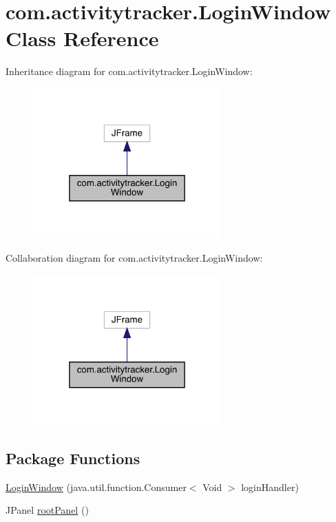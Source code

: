 \hypertarget{classcom_1_1activitytracker_1_1_login_window}{}\section{com.\+activitytracker.\+Login\+Window Class Reference}
\label{classcom_1_1activitytracker_1_1_login_window}


Inheritance diagram for com.\+activitytracker.\+Login\+Window\+:\nopagebreak
\begin{figure}[H]
\begin{center}
\leavevmode
\includegraphics[width=205pt]{classcom_1_1activitytracker_1_1_login_window__inherit__graph}
\end{center}
\end{figure}


Collaboration diagram for com.\+activitytracker.\+Login\+Window\+:\nopagebreak
\begin{figure}[H]
\begin{center}
\leavevmode
\includegraphics[width=205pt]{classcom_1_1activitytracker_1_1_login_window__coll__graph}
\end{center}
\end{figure}
\subsection*{Package Functions}
\begin{DoxyCompactItemize}
\item 
\mbox{\hyperlink{classcom_1_1activitytracker_1_1_login_window_a137cce127ffa1660c70d3fddbc0e2a74}{Login\+Window}} (java.\+util.\+function.\+Consumer$<$ Void $>$ login\+Handler)
\item 
J\+Panel \mbox{\hyperlink{classcom_1_1activitytracker_1_1_login_window_ab1ea45e86bbb79bccd06531279f1e443}{root\+Panel}} ()
\end{DoxyCompactItemize}
